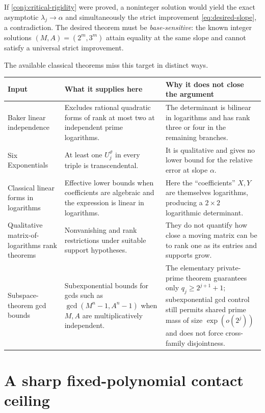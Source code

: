 \documentclass[11pt]{article}
\theoremstyle{definition}
\newcommand{\vtheta}{\vartheta}
\begin{document}
\begin{aeopenbox}
If \cref{conj:critical-rigidity} were proved, a noninteger solution would yield the exact
asymptotic $\lambda_j\to\alpha$ and simultaneously the strict improvement
\eqref{eq:desired-slope}, a contradiction.  The desired theorem must be
\emph{base-sensitive}: the known integer solutions $(M,A)=(2^m,3^m)$ attain equality at
the same slope and cannot satisfy a universal strict improvement.
\end{aeopenbox}

The available classical theorems miss this target in distinct ways.

\begin{longtable}{@{}p{}p{}p{}@{}}
\toprule
Input & What it supplies here & Why it does not close the argument \\
\midrule
\endhead
Baker linear independence & Excludes rational quadratic forms of rank at most two at
independent prime logarithms. & The determinant is bilinear in logarithms and has rank
three or four in the remaining branches. \\
\addlinespace
Six Exponentials & At least one $U_j^{\vtheta}$ in every triple is transcendental. & It is
qualitative and gives no lower bound for the relative error at slope $\alpha$. \\
\addlinespace
Classical linear forms in logarithms & Effective lower bounds when coefficients are
algebraic and the expression is linear in logarithms. & Here the ``coefficients'' $X,Y$
are themselves logarithms, producing a $2\times2$ logarithmic determinant. \\
\addlinespace
Qualitative matrix-of-logarithms rank theorems & Nonvanishing and rank restrictions under
suitable support hypotheses. & They do not quantify how close a moving matrix can be to
rank one as its entries and supports grow. \\
\addlinespace
Subspace-theorem gcd bounds & Subexponential bounds for gcds such as
$\gcd(M^n-1,A^n-1)$ when $M,A$ are multiplicatively independent. & The elementary private-
prime theorem guarantees only $q_j\ge2^{j+1}+1$; subexponential gcd control still permits
shared prime mass of size $\exp(o(2^j))$ and does not force cross-family disjointness. \\
\bottomrule
\end{longtable}

\section{A sharp fixed-polynomial contact ceiling}
\label{sec:polynomial-ceiling}
\end{document}

